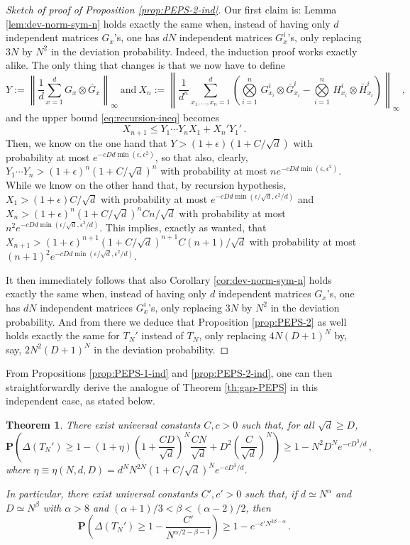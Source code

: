 \documentclass{amsart}
\newtheorem{theorem}{Theorem}[section]
\renewcommand{\P}{\mathbf{P}}
\renewcommand{\leq}{\leqslant}
\renewcommand{\geq}{\geqslant}
\begin{document}
\begin{proof}[Sketch of proof of Proposition \ref{prop:PEPS-2-ind}]
    Our first claim is: Lemma \ref{lem:dev-norm-sym-n} holds exactly the same when, instead of having only $d$ independent matrices $G_x$'s, one has $dN$ independent matrices $G_x^i$'s, only replacing $3N$ by $N^2$ in the deviation probability. Indeed, the induction proof works exactly alike. The only thing that changes is that we now have to define
    \[ Y := \left\| \frac{1}{d}\sum_{x=1}^d G_x\otimes \bar{G}_x \right\|_{\infty} \ \text{and}\  X_n := \left\| \frac{1}{d^n}\sum_{x_1,\ldots,x_n=1}^d \left( \underset{i=1}{\overset{n}{\bigotimes}}\, G_{x_i}^i\otimes\bar{G}_{x_i}^i - \underset{i=1}{\overset{n}{\bigotimes}}\, H_{x_i}^i\otimes\bar{H}_{x_i}^i \right) \right\|_{\infty} \, , \]
    and the upper bound \eqref{eq:recursion-ineq} becomes
    \[ X_{n+1} \leq Y_1\cdots Y_n X_1 + X_n'Y_1' \, . \]
    Then, we know on the one hand that $Y>(1+\epsilon)(1+C/\sqrt{d})$ with probability at most $e^{-cDd\min(\epsilon,\epsilon^2)}$, so that also, clearly, $Y_1\cdots Y_n >(1+\epsilon)^n(1+C/\sqrt{d})^n$ with probability at most $ne^{-cDd\min(\epsilon,\epsilon^2)}$. While we know on the other hand that, by recursion hypothesis, $X_1>(1+\epsilon)C/\sqrt{d}$ with probability at most $e^{-cDd\min(\epsilon/\sqrt{d},\epsilon^2/d)}$ and $X_n>(1+\epsilon)^n(1+C/\sqrt{d})^nCn/\sqrt{d}$ with probability at most $n^2e^{-cDd\min(\epsilon/\sqrt{d},\epsilon^2/d)}$. This implies, exactly as wanted, that $X_{n+1}>(1+\epsilon)^{n+1}(1+C/\sqrt{d})^{n+1}C(n+1)/\sqrt{d}$ with probability at most $(n+1)^2e^{-cDd\min(\epsilon/\sqrt{d},\epsilon^2/d)}$.

    It then immediately follows that also Corollary \ref{cor:dev-norm-sym-n} holds exactly the same when, instead of having only $d$ independent matrices $G_x$'s, one has $dN$ independent matrices $G_x^i$'s, only replacing $3N$ by $N^2$ in the deviation probability. And from there we deduce that Proposition \ref{prop:PEPS-2} as well holds exactly the same for $T_N'$ instead of $T_N$, only replacing $4N(D+1)^{N}$ by, say, $2N^2(D+1)^{N}$ in the deviation probability.
\end{proof}

From Propositions \ref{prop:PEPS-1-ind} and \ref{prop:PEPS-2-ind}, one can then straightforwardly derive the analogue of Theorem \ref{th:gap-PEPS} in this independent case, as stated below.

\begin{theorem} \label{th:gap-PEPS-ind}
    There exist universal constants $C,c>0$ such that, for all $\sqrt{d}\geq D$,
    \[  \P\left( \Delta(T_N') \geq 1 - (1+\eta)\left(1+\frac{CD}{\sqrt{d}}\right)^N\frac{CN}{\sqrt{d}} +D^2\left(\frac{C}{\sqrt{d}}\right)^N \right) \geq 1- N^2D^{N}e^{-cD^3/d}  \, , \]
    where $\eta\equiv\eta(N,d,D)= d^N N^{2N} (1+C/\sqrt{d})^N e^{-cD^3/d}$.

    In particular, there exist universal constants $C',c'>0$ such that, if $d\simeq N^{\alpha}$ and $D\simeq N^{\beta}$ with $\alpha>8$ and $(\alpha+1)/3<\beta<(\alpha-2)/2$, then
    \[ \P\left( \Delta(T_N') \geq 1-\frac{C'}{N^{\alpha/2-\beta-1}} \right) \geq 1-e^{-c'N^{3\beta-\alpha}} \, . \]
\end{theorem}
\end{document}
